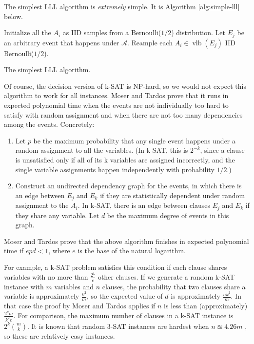 \documentclass{article}
\begin{document}
The simplest LLL algorithm is \emph{extremely} simple.  It is Algorithm \ref{alg:simple-lll} below.

\begin{algorithm}[H]
\label{alg:simple-lll}
\begin{algorithmic}
\State Initialize all the $A_i$ as IID samples from a Bernoulli($1/2$) distribution.
  \State Let $E_j$ be an arbitrary event that happens under $\mathcal{A}$.
  \State Reample each $A_i \in \operatorname{vlb}(E_j)$ IID Bernoulli($1/2$).
\EndWhile
\end{algorithmic}
\caption{The simplest LLL algorithm.}
\end{algorithm}

Of course, the decision version of k-SAT is NP-hard, so we would not expect this algorithm to work for all instances.  Moser and Tardos \cite{moser2010constructive} prove that it runs in expected polynomial time when the events are not individually too hard to satisfy with random assignment and when there are not too many dependencies among the events.  Concretely:
\begin{enumerate}
  \item Let $p$ be the maximum probability that any single event happens under a random assignment to all the variables.  (In k-SAT, this is $2^{-k}$, since a clause is unsatisfied only if all of its k variables are assigned incorrectly, and the single variable assignments happen independently with probability $1/2$.)
  \item Construct an undirected dependency graph for the events, in which there is an edge between $E_j$ and $E_k$ if they are statistically dependent under random assignment to the $A_i$.  In k-SAT, there is an edge between clauses $E_j$ and $E_k$ if they share any variable.  Let $d$ be the maximum degree of events in this graph.
\end{enumerate}
Moser and Tardos prove that the above algorithm finishes in expected polynomial time if $e p d < 1$, where $e$ is the base of the natural logarithm.

For example, a k-SAT problem satisfies this condition if each clause shares variables with no more than $\frac{2^k}{e}$ other clauses.  If we generate a random k-SAT instance with $m$ variables and $n$ clauses, the probability that two clauses share a variable is approximately $\frac{k^2}{m}$, so the expected value of $d$ is approximately $\frac{n k^2}{m}$.  In that case the proof by Moser and Tardos applies if $n$ is less than (approximately) $\frac{2^k m}{k^2 e}$.  For comparison, the maximum number of clauses in a k-SAT instance is $2^k {m \choose k}$.  It is known that random 3-SAT instances are hardest when $n \approxeq 4.26 m$ \cite{gomes2008satisfiability}, so these are relatively easy instances.
\end{document}
